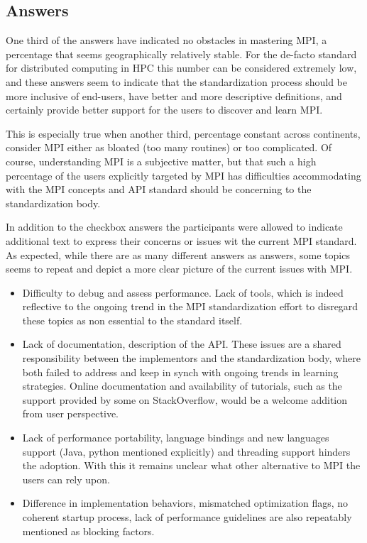 
\subsection{Answers}



One third of the answers have indicated no obstacles in mastering MPI, a percentage that seems geographically relatively stable. For the de-facto standard for distributed computing in HPC this number can be considered extremely low, and these answers seem to indicate that the standardization process should be more inclusive of end-users, have better and more descriptive definitions, and certainly provide better support for the users to discover and learn MPI.

This is especially true when another third, percentage constant across continents, consider MPI either as bloated (too many routines) or too complicated. Of course, understanding MPI is a subjective matter, but that such a high percentage of the users explicitly targeted by MPI has difficulties accommodating with the MPI concepts and API standard should be concerning to the standardization body.

In addition to the checkbox answers the participants were allowed to indicate additional text to express their concerns or issues wit the current MPI standard. As expected, while there are as many different answers as answers, some topics seems to repeat and depict a more clear picture of the current issues with MPI.

\begin{itemize}
\item Difficulty to debug and assess performance. Lack of tools, which is indeed reflective to the ongoing trend in the MPI standardization effort to disregard these topics as non essential to the standard itself.
\item Lack of documentation, description of the API. These issues are a shared responsibility between the implementors and the standardization body, where both failed to address and keep in synch with ongoing trends in learning strategies. Online documentation and availability of tutorials, such as the support provided by some on StackOverflow, would be a welcome addition from user perspective.
\item Lack of performance portability, language bindings and new languages support (Java, python mentioned explicitly) and threading support hinders the adoption. With this it remains unclear what other alternative to MPI the users can rely upon.
\item Difference in implementation behaviors, mismatched optimization flags, no coherent startup process, lack of performance guidelines are also repeatably mentioned as blocking factors.
\end{itemize}


